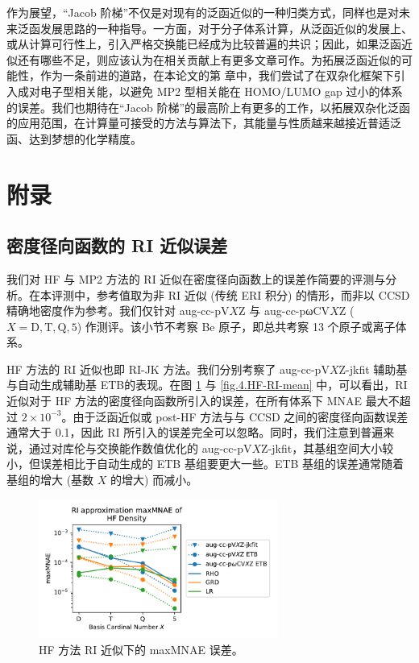 作为展望，“Jacob 阶梯”不仅是对现有的泛函近似的一种归类方式，同样也是对未来泛函发展思路的一种指导。一方面，对于分子体系计算，从泛函近似的发展上、或从计算可行性上，引入严格交换能已经成为比较普遍的共识；因此，如果泛函近似还有哪些不足，则应该认为在相关贡献上有更多文章可作。为拓展泛函近似的可能性，作为一条前进的道路，在本论文的第  章中，我们尝试了在双杂化框架下引入成对电子型相关能，以避免 MP2 型相关能在 HOMO/LUMO gap 过小的体系的误差。我们也期待在“Jacob 阶梯”的最高阶上有更多的工作，以拓展双杂化泛函的应用范围，在计算量可接受的方法与算法下，其能量与性质越来越接近普适泛函、达到梦想的化学精度。

\section{附录}

\subsection{密度径向函数的 RI 近似误差}

我们对 HF 与 MP2 方法的 RI 近似在密度径向函数上的误差作简要的评测与分析。在本评测中，参考值取为非 RI 近似 (传统 ERI 积分) 的情形，而非以 CCSD 精确地密度作为参考。我们仅针对 aug-cc-pV$X$Z 与 aug-cc-pωCV$X$Z ($X=\mathrm{D,T,Q,5}$) 作测评。该小节不考察 Be 原子，即总共考察 13 个原子或离子体系。

HF 方法的 RI 近似也即 RI-JK 方法。我们分别考察了 aug-cc-pV$X$Z-jkfit 辅助基与自动生成辅助基 ETB的表现。在图 \ref{fig.4.HF-RI-err} 与 \ref{fig.4.HF-RI-mean} 中，可以看出，RI 近似对于 HF 方法的密度径向函数所引入的误差，在所有体系下 MNAE 最大不超过 $2 \times 10^{-3}$。由于泛函近似或 post-HF 方法与与 CCSD 之间的密度径向函数误差通常大于 0.1，因此 RI 所引入的误差完全可以忽略。同时，我们注意到普遍来说，通过对库伦与交换能作数值优化的 aug-cc-pV$X$Z-jkfit，其基组空间大小较小，但误差相比于自动生成的 ETB 基组要更大一些。ETB 基组的误差通常随着基组的增大 (基数 $X$ 的增大) 而减小。

\begin{figure}[t]
  \centering
  \includegraphics[width=0.7\textwidth]{assets/HF-RI-err.pdf}
  \caption[HF 方法 RI 近似下的 maxMNAE 误差]{HF 方法 RI 近似下的 maxMNAE 误差。}
  \label{fig.4.HF-RI-err}
\end{figure}

